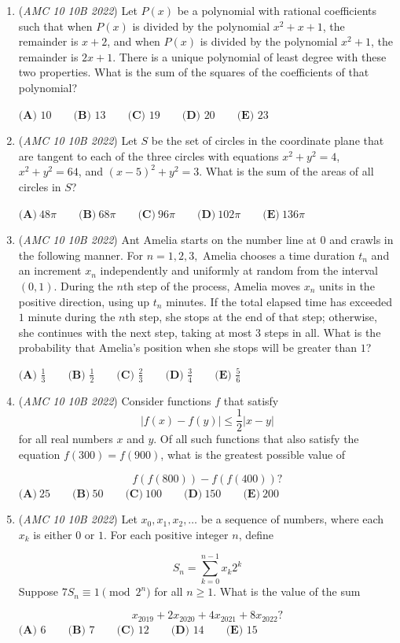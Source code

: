 \begin{enumerate}
	\item (\textit{AMC 10 10B 2022}) Let $P(x)$ be a polynomial with rational coefficients such that when $P(x)$ is divided by the polynomial $x^2 + x + 1$, the remainder is $x + 2$, and when $P(x)$ is divided by the polynomial $x^2 + 1$, the remainder is $2x + 1$. There is a unique polynomial of least degree with these two properties. What is the sum of the squares of the coefficients of that polynomial?


 $\textbf{(A) } 10 \qquad \textbf{(B) } 13 \qquad \textbf{(C) } 19 \qquad \textbf{(D) } 20 \qquad \textbf{(E) } 23$


	\item (\textit{AMC 10 10B 2022}) Let $S$ be the set of circles in the coordinate plane that are tangent to each of the three circles with equations $x^{2}+y^{2}=4$, $x^{2}+y^{2}=64$, and $(x-5)^{2}+y^{2}=3$. What is the sum of the areas of all circles in $S$?


 $\textbf{(A)}~48\pi\qquad\textbf{(B)}~68\pi\qquad\textbf{(C)}~96\pi\qquad\textbf{(D)}~102\pi\qquad\textbf{(E)}~136\pi\qquad$


	\item (\textit{AMC 10 10B 2022}) Ant Amelia starts on the number line at $0$ and crawls in the following manner. For $n=1,2,3,$ Amelia chooses a time duration $t_n$ and an increment $x_n$ independently and uniformly at random from the interval $(0,1).$ During the $n$th step of the process, Amelia moves $x_n$ units in the positive direction, using up $t_n$ minutes. If the total elapsed time has exceeded $1$ minute during the $n$th step, she stops at the end of that step; otherwise, she continues with the next step, taking at most $3$ steps in all. What is the probability that Amelia’s position when she stops will be greater than $1$?


 $\textbf{(A) }\frac{1}{3} \qquad \textbf{(B) }\frac{1}{2} \qquad \textbf{(C) }\frac{2}{3} \qquad \textbf{(D) }\frac{3}{4} \qquad \textbf{(E) }\frac{5}{6}$


	\item (\textit{AMC 10 10B 2022}) Consider functions $f$ that satisfy 
 \[|f(x)-f(y)|\leq \frac{1}{2}|x-y|\] for all real numbers $x$ and $y$. Of all such functions that also satisfy the equation $f(300) = f(900)$, what is the greatest possible value of

 \[f(f(800))-f(f(400))?\]
$\textbf{(A)}\ 25 \qquad\textbf{(B)}\ 50 \qquad\textbf{(C)}\ 100 \qquad\textbf{(D)}\ 150 \qquad\textbf{(E)}\ 200$


	\item (\textit{AMC 10 10B 2022}) Let $x_0,x_1,x_2,\dotsc$ be a sequence of numbers, where each $x_k$ is either $0$ or $1$. For each positive integer $n$, define 

 \[S_n = \sum_{k=0}^{n-1} x_k 2^k\]
Suppose $7S_n \equiv 1 \pmod{2^n}$ for all $n \geq 1$. What is the value of the sum  

 \[x_{2019} + 2x_{2020} + 4x_{2021} + 8x_{2022}?\]
$\textbf{(A) } 6 \qquad \textbf{(B) } 7 \qquad \textbf{(C) }12\qquad \textbf{(D) } 14\qquad \textbf{(E) }15$


\end{enumerate}